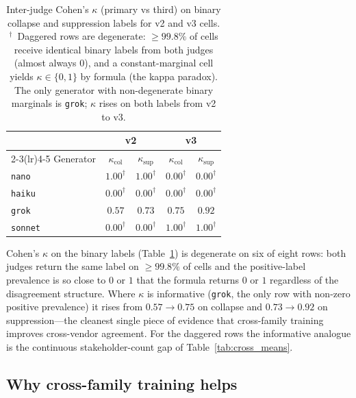 \documentclass[11pt]{article}
\begin{document}
\begin{table}[t]
\centering\small
\begin{tabular}{lcccc}
\toprule
& \multicolumn{2}{c}{\textbf{v2}} & \multicolumn{2}{c}{\textbf{v3}} \\
\cmidrule(lr){2-3}\cmidrule(lr){4-5}
Generator & $\kappa_{\text{col}}$ & $\kappa_{\text{sup}}$ & $\kappa_{\text{col}}$ & $\kappa_{\text{sup}}$ \\
\midrule
\texttt{nano}   & $1.00^\dagger$ & $1.00^\dagger$ & $0.00^\dagger$ & $0.00^\dagger$ \\
\texttt{haiku}  & $0.00^\dagger$ & $0.00^\dagger$ & $0.00^\dagger$ & $0.00^\dagger$ \\
\texttt{grok}   & $0.57$ & $0.73$ & $\mathbf{0.75}$ & $\mathbf{0.92}$ \\
\texttt{sonnet} & $0.00^\dagger$ & $0.00^\dagger$ & $1.00^\dagger$ & $1.00^\dagger$ \\
\bottomrule
\end{tabular}
\caption{Inter-judge Cohen's $\kappa$ (primary vs third) on binary
collapse and suppression labels for v2 and v3 cells.
$^\dagger$~Daggered rows are degenerate: $\geq 99.8\%$ of cells receive
identical binary labels from both judges (almost always $0$), and a
constant-marginal cell yields $\kappa \in \{0,1\}$ by formula (the
kappa paradox). The only generator with non-degenerate binary marginals
is \texttt{grok}; $\kappa$ rises on both labels from v2 to v3.}
\label{tab:tg_kappa}
\end{table}

Cohen's $\kappa$ on the binary labels (Table~\ref{tab:tg_kappa}) is
degenerate on six of eight rows: both judges return the same label on
$\geq 99.8\%$ of cells and the positive-label prevalence is so close to
$0$ or $1$ that the formula returns $0$ or $1$ regardless of the
disagreement structure. Where $\kappa$ is informative (\texttt{grok},
the only row with non-zero positive prevalence) it rises from
$0.57\!\to\!0.75$ on collapse and $0.73\!\to\!0.92$ on suppression---the
cleanest single piece of evidence that cross-family training improves
cross-vendor agreement. For the daggered rows the informative analogue
is the continuous stakeholder-count gap of
Table~\ref{tab:cross_means}.

\subsection{Why cross-family training helps}
\label{app:tg-why}
\end{document}
